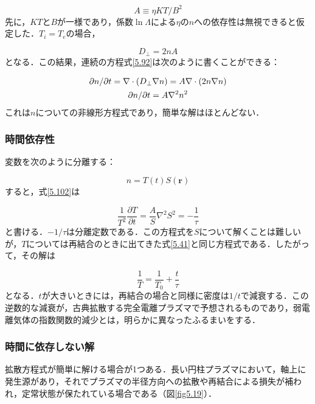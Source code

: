 \documentclass{ltjsarticle}
\numberwithin{equation}{section} %
\begin{document}
\begin{equation}
  A \equiv \eta KT/B^2 \label{5.100}
\end{equation}
先に，$KT$と$B$が一様であり，係数$\ln{\Lambda}$による$\eta$の$n$への依存性は無視できると仮定した．$T_i=T_e$の場合，

\begin{equation}
  D_\perp = 2nA \label{5.101}
\end{equation}
となる．この結果，連続の方程式\eqref{5.92}は次のように書くことができる：

\begin{gather}
  \partial n/\partial t = \nabla \cdot (D_\perp \nabla n) = A\nabla \cdot (2n\nabla n) \notag\\
  \partial n/\partial t = A\nabla^2n^2 \label{5.102}
\end{gather}
これは$n$についての非線形方程式であり，簡単な解はほとんどない．


\subsubsection{時間依存性} \label{section5.9.1}
変数を次のように分離する：

\[
  n = T(t)S(\bm{r})
\]
すると，式\eqref{5.102}は

\begin{equation}
  \frac{1}{T^2}\frac{\partial T}{\partial t} = \frac{A}{S}\nabla^2 S^2 = -\frac{1}{\tau} \label{5.103}
\end{equation}
と書ける．$-1/\tau$は分離定数である．この方程式を$S$について解くことは難しいが，$T$については再結合のときに出てきた式\eqref{5.41}と同じ方程式である．したがって，その解は

\begin{equation}
  \frac{1}{T} = \frac{1}{T_0} + \frac{t}{\tau} \label{5.104}
\end{equation}
となる．$t$が大きいときには，再結合の場合と同様に密度は$1/t$で減衰する．この逆数的な減衰が，古典拡散する完全電離プラズマで予想されるものであり，弱電離気体の指数関数的減少とは，明らかに異なったふるまいをする．


\subsubsection{時間に依存しない解} \label{section5.9.2}
拡散方程式が簡単に解ける場合が1つある．長い円柱プラズマにおいて，軸上に発生源があり，それでプラズマの半径方向への拡散や再結合による損失が補われ，定常状態が保たれている場合である（図\ref{fig5.19}）．
\end{document}
